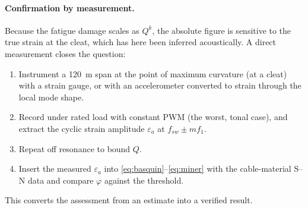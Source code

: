 \documentclass[11pt,a4paper,oneside]{book}
\begin{document}
\begin{onehalfspace}
\begin{appendices}
\paragraph{Confirmation by measurement.}
Because the fatigue damage scales as $Q^{k}$, the absolute figure is sensitive to
the true strain at the cleat, which has here been inferred acoustically. A direct
measurement closes the question:
\begin{enumerate}[leftmargin=*]
	\item Instrument a \SI{120}{\meter} span at the point of maximum curvature (at a
	cleat) with a strain gauge, or with an accelerometer converted to strain through
	the local mode shape.
	\item Record under rated load with constant PWM (the worst, tonal case), and
	extract the cyclic strain amplitude $\varepsilon_a$ at $f_{sw}\pm m f_1$.
	\item Repeat off resonance to bound $Q$.
	\item Insert the measured $\varepsilon_a$ into \eqref{eq:basquin}--\eqref{eq:miner}
	with the cable-material S--N data and compare $\varphi$ against the threshold.
\end{enumerate}
This converts the assessment from an estimate into a verified result.

\end{appendices}

\end{onehalfspace}
\newpage
\end{document}
